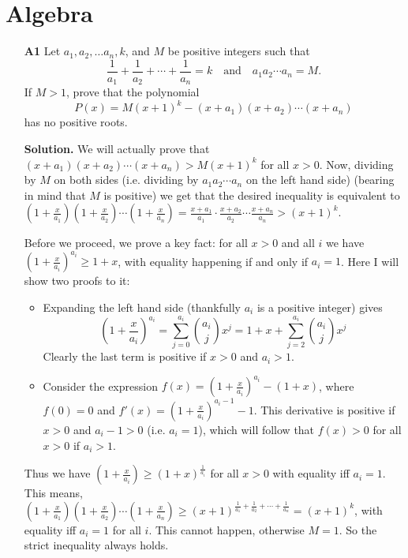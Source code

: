 \documentclass[11pt,a4paper]{article}
\begin{document}
\newpage
\section{Algebra}
\begin{enumerate}
	\item[\textbf{A1}]Let $a_1,a_2,\ldots a_n,k$, and $M$ be positive integers such that
	$$\frac{1}{a_1}+\frac{1}{a_2}+\cdots+\frac{1}{a_n}=k\quad\text{and}\quad a_1a_2\cdots a_n=M.$$If $M>1$, prove that the polynomial
	$$P(x)=M(x+1)^k-(x+a_1)(x+a_2)\cdots (x+a_n)$$has no positive roots.
	
	\textbf{Solution.} We will actually prove that $(x+a_1)(x+a_2)\cdots (x+a_n) > M(x+1)^k$ for all $x > 0$. 
	Now, dividing by $M$ on both sides (i.e. dividing by $a_1a_2\cdots a_n$ on the left hand side) (bearing in mind that $M$ is positive) we get that the desired inequality is equivalent to 
	$(1+\frac{x}{a_1})(1+\frac{x}{a_2})\cdots (1+\frac{x}{a_n}) = \frac{x+a_1}{a_1}\cdot\frac{x+a_2}{a_2}\cdots \frac{x+a_n}{a_n} > (x+1)^k$. 
	
	Before we proceed, we prove a key fact: for all $x > 0$ and all $i$ we have $(1+\frac{x}{a_i})^{a_i} \ge 1+x$, with equality happening if and only if $a_i = 1$. Here I will show two proofs to it: 
	\begin{itemize}
		\item Expanding the left hand side (thankfully $a_i$ is a positive integer) gives 
		\[(1+\frac{x}{a_i})^{a_i}=\sum_{j=0}^{a_i}\binom{a_i}{j}x^j=1+x+\sum_{j=2}^{a_i}\binom{a_i}{j}x^j\]
		Clearly the last term is positive if $x>0$ and $a_i>1$. 
		\item Consider the expression $f(x)=(1+\frac{x}{a_i})^{a_i} - (1+x)$, where $f(0)=0$ and $f'(x)=(1+\frac{x}{a_i})^{a_i-1}-1$. This derivative is positive if $x>0$ and $a_i-1>0$ (i.e. $a_i=1$), which will follow that $f(x)>0$ for all $x>0$ if $a_i>1$. 
	\end{itemize}
Thus we have $(1+\frac{x}{a_i}) \ge (1+x)^{\frac{1}{a_i}}$ for all $x>0$ with equality iff $a_i=1$. This means, 
$(1+\frac{x}{a_1})(1+\frac{x}{a_2})\cdots (1+\frac{x}{a_n}) \ge (x+1)^{\frac{1}{a_1}+\frac{1}{a_2}+\cdots + \frac{1}{a_n}}=(x+1)^k$, with equality iff $a_i=1$ for all $i$. This cannot happen, otherwise $M=1$. So the strict inequality always holds. 


\end{enumerate}
\end{document}
